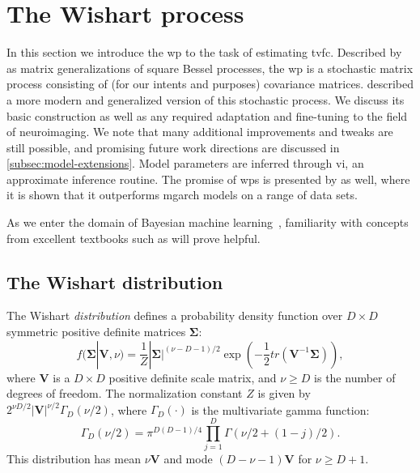 \clearpage
\section{The Wishart process}\label{sec:wishart-process}

In this section we introduce the \gls{wp} to the task of estimating \gls{tvfc}.
Described by \textcite{Bru1991} as matrix generalizations of square Bessel processes, the \gls{wp} is a stochastic matrix process consisting of (for our intents and purposes) covariance matrices.
\textcite{Wilson2010} described a more modern and generalized version of this stochastic process.
%
We discuss its basic construction as well as any required adaptation and fine-tuning to the field of neuroimaging.
We note that many additional improvements and tweaks are still possible, and promising future work directions are discussed in \cref{subsec:model-extensions}.
Model parameters are inferred through \gls{vi}, an approximate inference routine.
The promise of \glspl{wp} is presented by \textcite{Wilson2010, Heaukulani2019} as well, where it is shown that it outperforms \gls{mgarch} models on a range of data sets.

As we enter the domain of Bayesian machine learning~\parencite{Ghahramani2015}, familiarity with concepts from excellent textbooks such as \textcite{MacKay2002, Bishop2006, Hastie2009, Murphy2012, Murphy2023} will prove helpful.

\subsection{The Wishart distribution}\label{subsec:wishart-distribution}

The Wishart \emph{distribution} defines a probability density function over $D \times D$ symmetric positive definite matrices $\mathbf{\Sigma}$:
\begin{equation}
  f(\mathbf{\Sigma}|\mathbf{V},\nu) = \frac{1}{Z} |\mathbf{\Sigma}|^{(\nu - D - 1)/2} \exp{(-\frac12tr(\mathbf{V}^{-1}\mathbf{\Sigma}))},
\end{equation}
where $\mathbf{V}$ is a $D \times D$ positive definite scale matrix, and $\nu \geq D$ is the number of degrees of freedom.
The normalization constant $Z$ is given by $2^{\nu D/2}|\mathbf{V}|^{\nu/2}\Gamma_D(\nu/2)$, where $\Gamma_D(\cdot)$ is the multivariate gamma function:
\begin{equation}
  \Gamma_D(\nu/2) = \pi^{D(D-1)/4} \prod_{j=1}^D \Gamma(\nu/2 + (1-j)/2).
\end{equation}
This distribution has mean $\nu \mathbf{V}$ and mode $(D - \nu - 1)\mathbf{V}$ for $\nu \geq D + 1$.

